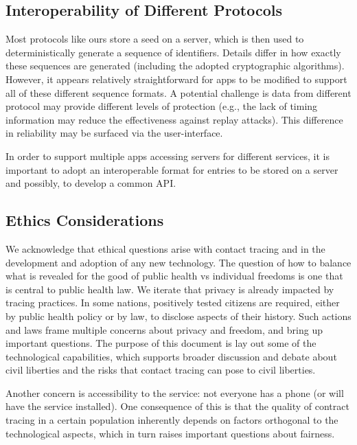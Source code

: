 \documentclass{article}
\begin{document}
\subsection{Interoperability of Different Protocols}

Most protocols like ours store a seed on a server, which is then used to deterministically generate a sequence of identifiers. Details differ in how exactly these sequences are generated (including the adopted cryptographic algorithms).  However, it appears relatively straightforward for apps to be modified to support all of these different sequence formats. A potential challenge is data from different protocol may provide different levels of protection (e.g., the lack of timing information may reduce the effectiveness against replay attacks). This difference in reliability may be surfaced via the user-interface.

In order to support multiple apps accessing servers for different services, it is important to adopt an interoperable format for entries to be stored on a server and possibly, to develop a common API.

\subsection{Ethics Considerations}
We acknowledge that ethical questions arise with contact tracing and in the development and adoption of any new technology. The question of how to balance what is revealed for the good of public health vs individual freedoms is one that is central to public health law. We iterate that privacy is already impacted by tracing practices. In some nations, positively tested citizens are required, either by public health policy or by law, 
to disclose aspects of their history. Such actions and laws frame multiple concerns about privacy and freedom, and bring up important questions.  The purpose of this document is lay out some of the technological capabilities, which supports broader discussion and debate about civil liberties and the risks that contact tracing can pose to civil liberties.

Another concern is accessibility to the service: not everyone has a phone (or will have the service installed). One consequence of this is that the quality of contract tracing in a certain population inherently depends on factors orthogonal to the technological aspects, which in turn raises important questions about fairness.
\end{document}
